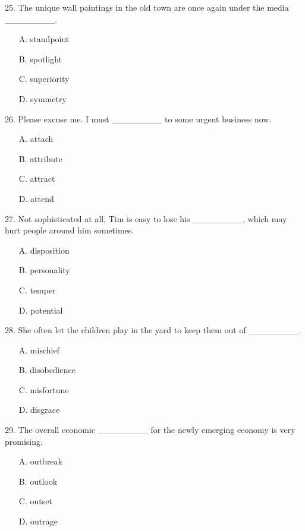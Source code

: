 \documentclass[UTF8,11pt]{ctexart}
\begin{document}
25. The unique wall paintings in the old town are once again under the media \_\_\_\_\_\_\_\_.


\begin{itemize}[leftmargin=2em,itemsep=.2em,topsep=.4em]\item[A.] standpoint
\item[B.] spotlight
\item[C.] superiority
\item[D.] symmetry
\end{itemize}

26. Please excuse me. I must \_\_\_\_\_\_\_\_ to some urgent business now.


\begin{itemize}[leftmargin=2em,itemsep=.2em,topsep=.4em]\item[A.] attach
\item[B.] attribute
\item[C.] attract
\item[D.] attend
\end{itemize}

27. Not sophisticated at all, Tim is easy to lose his \_\_\_\_\_\_\_\_, which may hurt people around him sometimes.


\begin{itemize}[leftmargin=2em,itemsep=.2em,topsep=.4em]\item[A.] disposition
\item[B.] personality
\item[C.] temper
\item[D.] potential
\end{itemize}

28. She often let the children play in the yard to keep them out of \_\_\_\_\_\_\_\_.


\begin{itemize}[leftmargin=2em,itemsep=.2em,topsep=.4em]\item[A.] mischief
\item[B.] disobedience
\item[C.] misfortune
\item[D.] disgrace
\end{itemize}

29. The overall economic \_\_\_\_\_\_\_\_ for the newly emerging economy is very promising.


\begin{itemize}[leftmargin=2em,itemsep=.2em,topsep=.4em]\item[A.] outbreak
\item[B.] outlook
\item[C.] outset
\item[D.] outrage
\end{itemize}
\end{document}
